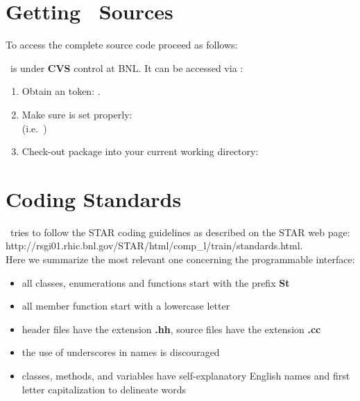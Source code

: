 
\section{Getting \StMcEvent\ Sources}  

To access the complete source code proceed as follows:

\StMcEvent\ is under {\bf CVS} control at BNL.  It can
be accessed via :   
\begin{enumerate}
  \item Obtain an  token: .
  \item Make sure  is set properly:\\ %
    (i.e.~)
  \item Check-out package into your current working directory:\\
\end{enumerate}


\section{Coding Standards}

\StMcEvent\ tries to follow the STAR coding guidelines as described on the
STAR web page: \\
http://rsgi01.rhic.bnl.gov/STAR/html/comp\_l/train/standards.html.\\
Here we
summarize the most relevant one concerning the programmable interface:
\begin{itemize}
\item all classes, enumerations and functions start with the prefix
    \textbf{St}
\item all member function start with a lowercase letter
\item header files have the extension \textbf{.hh}, source files have
    the extension\textbf{ .cc}
\item the use of underscores in names is discouraged
\item classes, methods, and variables have self-explanatory English
    names and first letter capitalization to delineate words
\end{itemize}

